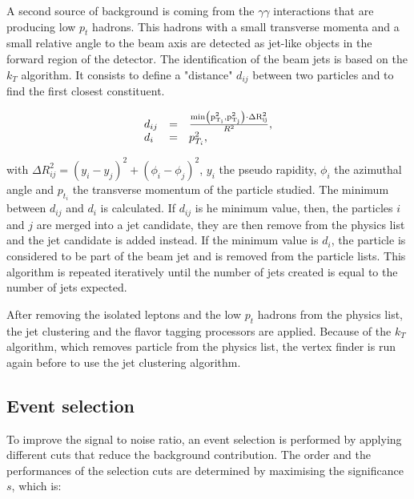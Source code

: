     A second source of background is coming from the $\gamma \gamma$ interactions that are producing low $p_{t}$ hadrons.
    This hadrons with a small transverse momenta and a small relative angle to the beam axis are detected as jet-like objects in the forward region of the detector.
    The identification of the beam jets is based on the $k_{T}$ algorithm.
    It consists to define a "distance" $d_{ij}$ between two particles and to find the first closest constituent.
    
    \begin{equation}
      \begin{array}{lcl}
        d_{ij} & = & \frac{\rm{min}\left(p^2_{T_i}, p^2_{T_j}\right) \cdot \Delta R^2_{ij}}{R^2}, \\
        d_{i}  & = & p^2_{T_i},
      \end{array}
    \end{equation}

    with $\Delta R^2_{ij} = \left( y_{i} - y_{j}\right)^2 + \left( \phi_{i} - \phi_{j}\right)^2$, $y_{i}$ the pseudo rapidity, $\phi_{i}$ the azimuthal angle and $p_{t_i}$ the transverse momentum of the particle studied.
    The minimum between $d_{ij}$ and $d_{i}$ is calculated.
    If $d_{ij}$ is he minimum value, then, the particles $i$ and $j$ are merged into a jet candidate, they are then remove from the physics list and the jet candidate is added instead.
    If the minimum value is $d_{i}$, the particle is considered to be part of the beam jet and is removed from the particle lists.
    This algorithm is repeated iteratively until the number of jets created is equal to the number of jets expected.
   
    After removing the isolated leptons and the low $p_{t}$ hadrons from the physics list, the jet clustering and the flavor tagging processors are applied. 
    Because of the $k_{T}$ algorithm, which removes particle from the physics list, the vertex finder is run again before to use the jet clustering algorithm.

  \subsection{Event selection}

  To improve the signal to noise ratio, an event selection is performed by applying different cuts that reduce the background contribution.
  The order and the performances of the selection cuts are determined by maximising the significance $s$, which is:

